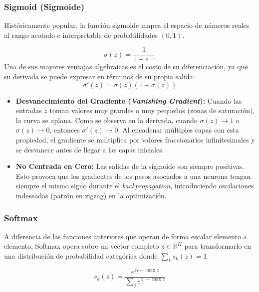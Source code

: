 \subsubsection{Sigmoid (Sigmoide)}

Históricamente popular, la función sigmoide mapea el espacio de números reales al rango acotado e interpretable de probabilidades $(0, 1)$.

\begin{equation}
    \sigma(z) = \frac{1}{1+e^{-z}}
\end{equation}
Una de sus mayores ventajas algebraicas es el costo de su diferenciación, ya que su derivada se puede expresar en términos de su propia salida:
\begin{equation}
    \sigma'(z) = \sigma(z)(1-\sigma(z))
\end{equation}

\begin{itemize}
    \item \textbf{Desvanecimiento del Gradiente (\textit{Vanishing Gradient}):} Cuando las entradas $z$ toman valores muy grandes o muy pequeños (zonas de saturación), la curva se aplana. Como se observa en la derivada, cuando $\sigma(z) \to 1$ o $\sigma(z) \to 0$, entonces $\sigma'(z) \to 0$. Al encadenar múltiples capas con esta propiedad, el gradiente se multiplica por valores fraccionarios infinitesimales y se desvanece antes de llegar a las capas iniciales.
    \item \textbf{No Centrada en Cero:} Las salidas de la sigmoide son siempre positivas. Esto provoca que los gradientes de los pesos asociados a una neurona tengan siempre el mismo signo durante el \textit{backpropagation}, introduciendo oscilaciones indeseadas (patrón en zigzag) en la optimización.
\end{itemize}


\subsubsection{Softmax}

A diferencia de las funciones anteriores que operan de forma escalar elemento a elemento, Softmax opera sobre un vector completo $z \in \mathbb{R}^K$ para transformarlo en una distribución de probabilidad categórica donde $\sum_k s_k(z) = 1$.

\begin{equation}
    s_k(z) = \frac{e^{z_k - \max z}}{\sum_j e^{z_j - \max z}}
\end{equation}

